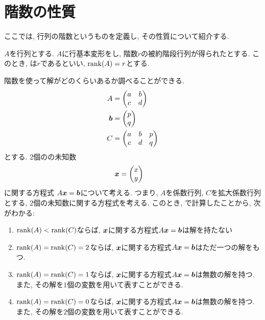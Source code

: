 \section{階数の性質}
ここでは,
行列の階数というものを定義し,
その性質について紹介する.

\begin{definition}
  \label{def:rank}
  $A$を行列とする.
  $A$に行基本変形をし,
  階数$r$の被約階段行列が得られたとする.
  このとき, 
  は$r$であるといい,
  $\operatorname{rank}(A)=r$とする.
\end{definition}
階数を使って解がどのくらいあるか調べることができる.
\begin{align*}
  A&=
  \begin{pmatrix}
    a&b\\
    c&d
  \end{pmatrix}\\
  \boldsymbol{b}&=
  \begin{pmatrix}
    p\\
    q
  \end{pmatrix}\\
  C&=
  \begin{pmatrix}
    a&b&p\\
    c&d&q
  \end{pmatrix}
\end{align*}
とする. 2個のの未知数
\begin{align*}
  \boldsymbol{x}&=
  \begin{pmatrix}
    x\\y
  \end{pmatrix}
\end{align*}
に関する方程式 $A\boldsymbol{x}=\boldsymbol{b}$について考える.
つまり, $A$を係数行列, $C$を拡大係数行列とする,
$2$個の未知数に関する方程式を考える.
このとき, で計算したことから,
次がわかる:
\begin{enumerate}
  \item $\operatorname{rank}(A)<\operatorname{rank}(C)$ならば,
  $\boldsymbol{x}$に関する方程式$A\boldsymbol{x}=\boldsymbol{b}$は解を持たない
  \item $\operatorname{rank}(A)=\operatorname{rank}(C)=2$ならば,
  $\boldsymbol{x}$に関する方程式$A\boldsymbol{x}=\boldsymbol{b}$はただ一つの解をもつ.
  \item $\operatorname{rank}(A)=\operatorname{rank}(C)=1$ならば,
    $\boldsymbol{x}$に関する方程式$A\boldsymbol{x}=\boldsymbol{b}$は無数の解を持つ.
    また, その解を$1$個の変数を用いて表すことができる.
  \item $\operatorname{rank}(A)=\operatorname{rank}(C)=0$ならば,
    $\boldsymbol{x}$に関する方程式$A\boldsymbol{x}=\boldsymbol{b}$は無数の解を持つ.
    また, その解を$2$個の変数を用いて表すことができる.
\end{enumerate}
